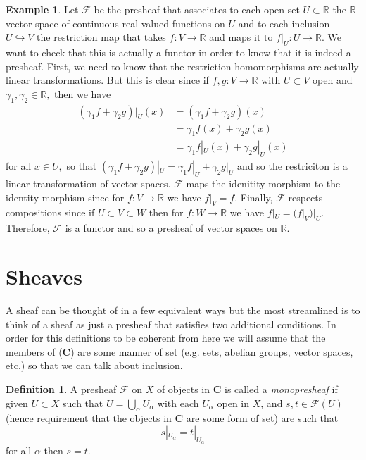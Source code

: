 \documentclass[psamsfonts]{amsart}
\theoremstyle{definition}
\newtheorem{defn}[thm]{Definition}
\newtheorem{exmp}[thm]{Example}
\theoremstyle{remark}
\numberwithin{equation}{section}
\begin{document}
   \begin{exmp}
    Let $\mathscr{F}$ be the presheaf that associates to each open set $U \subset \mathbb{R}$ the $\mathbb{R}$-vector space of continuous real-valued functions on $U$ and to each inclusion $U \hookrightarrow V$ the restriction map that takes $f: V \to \mathbb{R}$ and maps it to $f|_U: U \to \mathbb{R}.$ We want to check that this is actually a functor in order to know that it is indeed a presheaf. First, we need to know that the restriction homomorphisms are actually linear transformations. But this is clear since if $f,g:V \to \mathbb{R}$ with $U \subset V$ open and $\gamma_1, \gamma_2 \in \mathbb{R},$ then we have 
    \begin{equation*}
      \begin{split}
        (\gamma_1 f + \gamma_2 g)|_U(x) 
        & = (\gamma_1 f + \gamma_2 g)(x) \\
        & = \gamma_1 f(x) + \gamma_2 g(x) \\
        & = \gamma_1 f|_U(x) + \gamma_2 g|_U(x)
      \end{split}
    \end{equation*}
    for all $x \in U,$ so that $(\gamma_1 f + \gamma_2 g)|_U = \gamma_1 f|_U + \gamma_2 g|_U$ and so the restriciton is a linear transformation of vector spaces.
    $\mathscr{F}$ maps the idenitity morphism to the identity morphism since for $f: V \to \mathbb{R}$ we have $f|_V = f.$ Finally, $\mathscr{F}$ respects compositions since if $U \subset V \subset W$ then for $f: W \to \mathbb{R}$ we have $f|_U = (f|_V)|_U.$ Therefore, $\mathscr{F}$ is a functor and so a presheaf of vector spaces on $\mathbb{R}.$
   \end{exmp}



\section{Sheaves}
  A sheaf can be thought of in a few equivalent ways but the most streamlined is to think of a sheaf as just a presheaf that satisfies two additional conditions. In order for this definitions to be coherent from here we will assume that the members of (\textbf{C}) are some manner of set (e.g. sets, abelian groups, vector spaces, etc.) so that we can talk about inclusion.

  \begin{defn}
    A presheaf $\mathscr{F}$ on $X$ of objects in \textbf{C} is called a \textit{monopresheaf} if given $U \subset X$ such that $U = \bigcup_{\alpha} U_\alpha$ with each $U_\alpha$ open in $X$, and $s,t \in \mathscr{F}(U)$ (hence requirement that the objects in \textbf{C} are some form of set) are such that \[s|_{U_\alpha} = t|_{U_\alpha}\] for all $\alpha$ then $s = t.$ \cite{bredon_1997}
  \end{defn}
\end{document}
